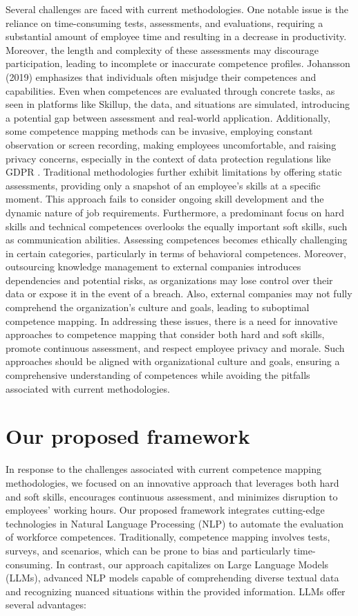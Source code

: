 Several challenges are faced with current methodologies. One notable issue is the reliance on time-consuming tests, assessments, and evaluations, requiring a substantial amount of employee time and resulting in a decrease in productivity. Moreover, the length and complexity of these assessments may discourage participation, leading to incomplete or inaccurate competence profiles. Johansson (2019) \cite{johansson2019assess} emphasizes that individuals often misjudge their competences and capabilities. Even when competences are evaluated through concrete tasks, as seen in platforms like Skillup, the data, and situations are simulated, introducing a potential gap between assessment and real-world application. Additionally, some competence mapping methods can be invasive, employing constant observation or screen recording, making employees uncomfortable, and raising privacy concerns, especially in the context of data protection regulations like GDPR \cite{computersweekly_uncomfortableworkers}. Traditional methodologies further exhibit limitations by offering static assessments, providing only a snapshot of an employee's skills at a specific moment. This approach fails to consider ongoing skill development and the dynamic nature of job requirements. Furthermore, a predominant focus on hard skills and technical competences overlooks the equally important soft skills, such as communication abilities. Assessing competences becomes ethically challenging in certain categories, particularly in terms of behavioral competences. Moreover, outsourcing knowledge management to external companies introduces dependencies and potential risks, as organizations may lose control over their data or expose it in the event of a breach. Also, external companies may not fully comprehend the organization's culture and goals, leading to suboptimal competence mapping. In addressing these issues, there is a need for innovative approaches to competence mapping that consider both hard and soft skills, promote continuous assessment, and respect employee privacy and morale. Such approaches should be aligned with organizational culture and goals, ensuring a comprehensive understanding of competences while avoiding the pitfalls associated with current methodologies.

\section{Our proposed framework}
\label{sec:proposedframework}

In response to the challenges associated with current competence mapping methodologies, we focused on an innovative approach that leverages both hard and soft skills, encourages continuous assessment, and minimizes disruption to employees' working hours. Our proposed framework integrates cutting-edge technologies in Natural Language Processing (NLP) to automate the evaluation of workforce competences. Traditionally, competence mapping involves tests, surveys, and scenarios, which can be prone to bias and particularly time-consuming. In contrast, our approach capitalizes on Large Language Models (LLMs), advanced NLP models capable of comprehending diverse textual data and recognizing nuanced situations within the provided information. LLMs offer several advantages:

